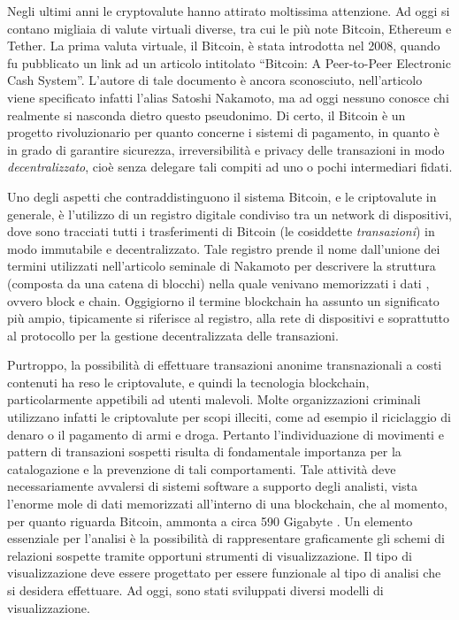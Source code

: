 Negli ultimi anni le cryptovalute hanno attirato moltissima attenzione. Ad oggi si contano migliaia di valute virtuali diverse, tra cui le più note Bitcoin, Ethereum e Tether. La prima valuta virtuale, il Bitcoin, è stata introdotta nel 2008, quando fu pubblicato un link ad un articolo intitolato “Bitcoin: A Peer-to-Peer Electronic Cash System”. L'autore di tale documento è ancora sconosciuto, nell'articolo viene specificato infatti l'alias Satoshi Nakamoto, ma ad oggi nessuno conosce chi realmente si nasconda dietro questo pseudonimo. Di certo, il Bitcoin è un progetto rivoluzionario per quanto concerne i sistemi di pagamento, in quanto è in grado di garantire sicurezza, irreversibilità e privacy delle transazioni in modo \emph{decentralizzato}, cioè senza delegare tali compiti ad uno o pochi intermediari fidati.

Uno degli aspetti che contraddistinguono il sistema Bitcoin, e le criptovalute in generale, è l'utilizzo di un registro digitale condiviso tra un network di dispositivi, dove sono tracciati tutti i trasferimenti di Bitcoin (le cosiddette \emph{transazioni}) in modo immutabile e decentralizzato. Tale  registro prende il nome dall'unione dei termini utilizzati  nell'articolo seminale di Nakamoto per descrivere la struttura (composta da una catena di blocchi) nella quale venivano memorizzati i dati \cite{bitcoin-paper}, ovvero block e chain. Oggigiorno il termine blockchain ha assunto un significato più ampio, tipicamente si riferisce al registro, alla rete di dispositivi e soprattutto al protocollo per la gestione decentralizzata delle transazioni. 

Purtroppo, la possibilità di effettuare transazioni anonime transnazionali a costi contenuti ha reso le criptovalute, e quindi la tecnologia blockchain, particolarmente appetibili ad utenti malevoli. Molte organizzazioni criminali utilizzano infatti le criptovalute per scopi illeciti, come ad esempio il riciclaggio di denaro o il pagamento di armi e droga.
Pertanto l'individuazione di movimenti e pattern di transazioni sospetti risulta di fondamentale importanza per la catalogazione e la prevenzione di tali comportamenti.
Tale attività deve necessariamente avvalersi di sistemi software a supporto degli analisti, vista l'enorme mole di dati memorizzati all'interno di una blockchain, che al momento, per quanto riguarda Bitcoin, ammonta a circa 590 Gigabyte \cite{blockchair}. Un elemento essenziale per l'analisi è la possibilità di rappresentare graficamente gli schemi di relazioni sospette tramite opportuni strumenti di visualizzazione. Il tipo di visualizzazione deve essere progettato per essere funzionale al tipo di analisi che si desidera effettuare. Ad oggi, sono stati sviluppati diversi modelli di visualizzazione. 

